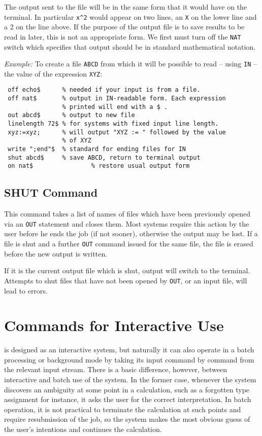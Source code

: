 The output sent to the file will be in the same form that it would have on
the terminal.  In particular {\tt x\^{ }2} would appear on two lines, an
{\tt X} on the lower line and a 2 on the line above.  If the purpose of the
output file is to save results to be read in later, this is not an
appropriate form.  We first must turn off the {\tt NAT} switch which
specifies that output should be in standard mathematical notation.

{\it Example:} To create a file {\tt ABCD} from which it will be possible
to read -- using {\tt IN} -- the value of the expression {\tt XYZ}:
\begin{verbatim}
 off echo$      % needed if your input is from a file.
 off nat$       % output in IN-readable form. Each expression
                % printed will end with a $ .
 out abcd$      % output to new file
 linelength 72$ % for systems with fixed input line length.
 xyz:=xyz;      % will output "XYZ := " followed by the value
                % of XYZ
 write ";end"$  % standard for ending files for IN
 shut abcd$     % save ABCD, return to terminal output
 on nat$                % restore usual output form
\end{verbatim}

\section{SHUT Command} 
This command takes a list of names of files which have been previously
opened via an {\tt OUT} statement and closes them. Most systems require this
action by the user before he ends the {\REDUCE} job (if not sooner),
otherwise the output may be lost. If a file is shut and a further {\tt OUT}
command issued for the same file, the file is erased before the new output
is written.

If it is the current output file which is shut, output will switch to the
terminal.  Attempts to shut files that have not been opened by {\tt OUT},
or an input file, will lead to errors.

\chapter{Commands for Interactive Use} 

{\REDUCE} is designed as an interactive system, but naturally it can also
operate in a batch processing or background mode by taking its input
command by command from the relevant input stream. There is a basic
difference, however, between interactive and batch use of the system. In
the former case, whenever the system discovers an ambiguity at some point
in a calculation, such as a forgotten type assignment for instance, it asks
the user for the correct interpretation. In batch operation, it is not
practical to terminate the calculation at such points and require
resubmission of the job, so the system makes the most obvious guess of the
user's intentions and continues the calculation.

